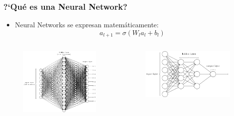 \documentclass[10pt]{beamer}
\begin{document}
\begin{frame}
\frametitle{?`Qu\'e es una Neural Network?}
\begin{beamerboxesrounded}[upper=uppercolor, lower=lowercolor, shadow=true]{} 

\begin{itemize}
 \item  Neural Networks se expresan matem\'aticamente:
 \begin{equation*}
  a_{l+1} = \sigma(W_l a_l + b_l)
 \end{equation*}
 
\end{itemize}
\end{beamerboxesrounded}

\begin{columns}
\begin{column}{.5\textwidth}
 \begin{figure}
  \includegraphics[scale=0.275]{./Figures/NeuralNetwork_big.png}
 \end{figure}  
\end{column}%

\begin{column}{.5\textwidth}
 \begin{figure}
  \includegraphics[scale=0.275]{./Figures/NeuralNetwork_small.png}
 \end{figure}  
\end{column}%


\end{columns}
\end{frame}
\end{document}
